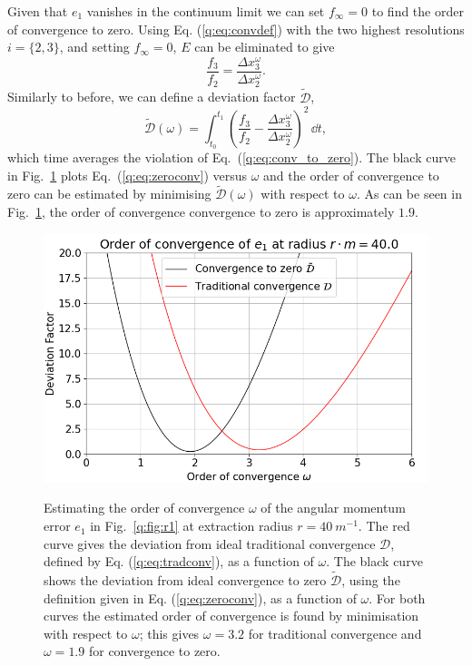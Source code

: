 Given that $e_1$ vanishes in the continuum limit we can set $f_\infty=0$ to find the order of convergence to zero. Using Eq. (\ref{q:eq:convdef}) with the two highest resolutions $i=\{2,3\}$, and setting $f_\infty=0$, $E$ can be eliminated to give
\begin{equation}\label{q:eq:conv_to_zero}
\frac{f_3}{f_2} = \frac{\Delta x_3^\omega}{\Delta x_2^\omega}.
\end{equation}
Similarly to before, we can define a deviation factor $\tilde{\mathcal{D}}$,
\begin{equation}\label{q:eq:zeroconv}
\tilde{\mathcal{D}}(\omega) = \int_{t_0}^{t_1}\left(\frac{f_3}{f_2} - \frac{\Delta x_3^\omega}{\Delta x_2^\omega}\right)^2\,\dd t,
\end{equation}
which time averages the violation of Eq.~(\ref{q:eq:conv_to_zero}). The black curve in Fig.~\ref{q:fig:D} plots Eq.~(\ref{q:eq:zeroconv}) versus $\omega$ and the order of convergence to zero can be estimated by minimising $\tilde{\mathcal{D}}(\omega)$ with respect to $\omega$. As can be seen in Fig.~\ref{q:fig:D}, the order of convergence convergence to zero is approximately $1.9$.
\begin{figure}[h]
{\includegraphics[width=0.65\columnwidth]{png/conv_order_40_0.png}}
\caption{Estimating the order of convergence $\omega$ of the angular momentum error $e_1$ in Fig.~\ref{q:fig:r1} at extraction radius $r=40 ~m^{-1}$. The red curve gives the deviation from ideal traditional convergence $\mathcal{D}$, defined by Eq. (\ref{q:eq:tradconv}), as a function of $\omega$. The black curve shows the deviation from ideal convergence to zero $\tilde{\mathcal{D}}$, using the definition given in Eq. (\ref{q:eq:zeroconv}), as a function of $\omega$.  For both curves the estimated order of convergence is found by minimisation with respect to $\omega$; this gives $\omega=3.2$ for traditional convergence and $\omega=1.9$ for convergence to zero. }
\label{q:fig:D}
\end{figure}














